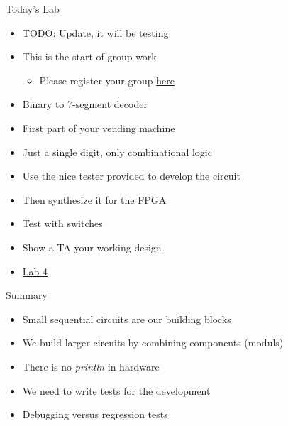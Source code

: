 \begin{frame}[fragile]{Today's Lab}
\begin{itemize}
\item TODO: Update, it will be testing
\item This is the start of group work
\begin{itemize}
\item Please register your group \href{https://docs.google.com/spreadsheets/d/1aQs_VnPw3uiJxUz9WuzPcM1R6VkDXqPtri7a3pWoTvs/edit?usp=sharing}{here}
\end{itemize}
\item Binary to 7-segment decoder
\item First part of your vending machine
\item Just a single digit, only combinational logic
\item Use the nice tester provided to develop the circuit
\item Then synthesize it for the FPGA
\item Test with switches
\item Show a TA your working design
\item \href{https://github.com/schoeberl/chisel-lab/tree/master/lab4}{Lab 4}
\end{itemize}
\end{frame}

\begin{frame}[fragile]{Summary}
\begin{itemize}
\item Small sequential circuits are our building blocks
\item We build larger circuits by combining components (moduls)
\item There is no \emph{println} in hardware
\item We need to write tests for the development
\item Debugging versus regression tests
\end{itemize}
\end{frame}




